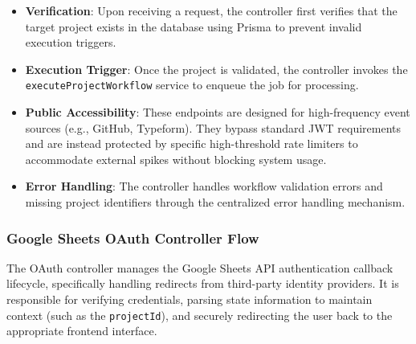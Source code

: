 \begin{itemize}
    \item \textbf{Verification}: Upon receiving a request, the controller first verifies that the target project exists in the database using Prisma to prevent invalid execution triggers.
    \item \textbf{Execution Trigger}: Once the project is validated, the controller invokes the \texttt{executeProjectWorkflow} service to enqueue the job for processing.
    \item \textbf{Public Accessibility}: These endpoints are designed for high-frequency event sources (e.g., GitHub, Typeform). They bypass standard JWT requirements and are instead protected by specific high-threshold rate limiters to accommodate external spikes without blocking system usage.
    \item \textbf{Error Handling}: The controller handles workflow validation errors and missing project identifiers through the centralized error handling mechanism.
\end{itemize}

\subsubsection{Google Sheets OAuth Controller Flow}

The OAuth controller manages the Google Sheets API authentication callback lifecycle, specifically handling redirects from third-party identity providers. It is responsible for verifying credentials, parsing state information to maintain context (such as the \texttt{projectId}), and securely redirecting the user back to the appropriate frontend interface.

